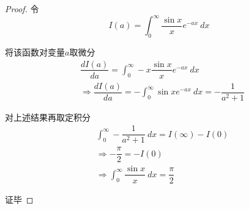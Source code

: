         \begin{proof}
            令
            \begin{equation*}
                I(a)=\int_{0}^{\infty}\dfrac{\sin x}{x}e^{-ax}\ dx
            \end{equation*}

            将该函数对变量$a$取微分
            \begin{equation*}
                \begin{split}
                    &\dfrac{dI(a)}{da}=\int_{0}^{\infty}-x\dfrac{\sin x}{x}e^{-ax}\ dx\\
                    &\Rightarrow \dfrac{dI(a)}{da}=-\int_{0}^{\infty}\sin x e^{-ax}\ dx=-\dfrac{1}{a^2+1}
                \end{split}
            \end{equation*}

            对上述结果再取定积分
            \begin{equation*}
                \begin{split}
                    &\int_{0}^{\infty}-\dfrac{1}{a^2+1}\ dx=I(\infty)-I(0)\\
                    &\Rightarrow -\dfrac{\pi}{2}=-I(0)\\
                    &\Rightarrow\int_{0}^{\infty}\dfrac{\sin x}{x}\ dx=\dfrac{\pi}{2}
                \end{split}
            \end{equation*}

            证毕
        \end{proof}

